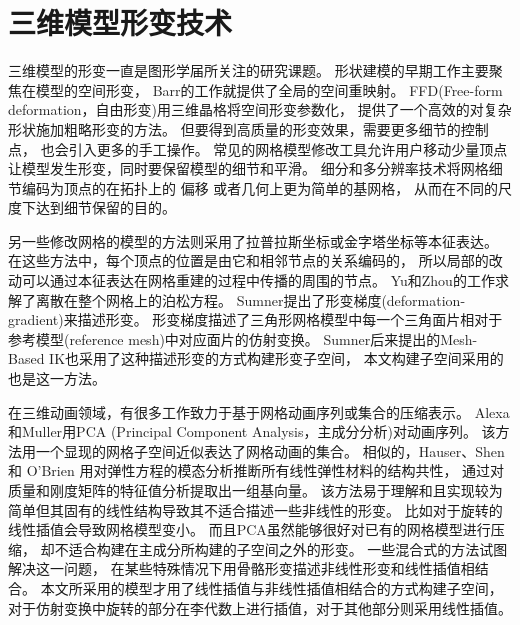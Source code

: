 \section{三维模型形变技术}
三维模型的形变一直是图形学届所关注的研究课题。
形状建模的早期工作主要聚焦在模型的空间形变，
Barr的工作\cite{barr1984global}就提供了全局的空间重映射。
FFD(Free-form deformation，自由形变)\cite{sederberg1986free}用三维晶格将空间形变参数化，
提供了一个高效的对复杂形状施加粗略形变的方法。
但要得到高质量的形变效果，需要更多细节的控制点\cite{coquillart1990extended}，
也会引入更多的手工操作。
常见的网格模型修改工具允许用户移动少量顶点让模型发生形变，同时要保留模型的细节和平滑。
细分和多分辨率技术将网格细节编码为顶点的在拓扑上的
偏移\cite{zorin1997interactive}\cite{kobbelt2000multiresolution}
或者几何上更为简单的基网格\cite{kobbelt1998interactive}，
从而在不同的尺度下达到细节保留的目的。

另一些修改网格的模型的方法则采用了拉普拉斯坐标或金字塔坐标等本征表达。
在这些方法中，每个顶点的位置是由它和相邻节点的关系编码的，
所以局部的改动可以通过本征表达在网格重建的过程中传播的周围的节点。
Yu和Zhou的工作\cite{yu2004mesh}求解了离散在整个网格上的泊松方程。
Sumner提出了形变梯度(deformation-gradient)\cite{sumner2004deformation}来描述形变。
形变梯度描述了三角形网格模型中每一个三角面片相对于参考模型(reference mesh)中对应面片的仿射变换。
Sumner后来提出的Mesh-Based IK\cite{sumner2005mesh}也采用了这种描述形变的方式构建形变子空间，
本文构建子空间采用的也是这一方法。

在三维动画领域，有很多工作致力于基于网格动画序列或集合的压缩表示。
Alexa和Muller\cite{alexa2000representing}用PCA
(Principal Component Analysis，主成分分析)对动画序列。
该方法用一个显现的网格子空间近似表达了网格动画的集合。
相似的，Hauser、Shen和 O’Brien\cite{hauser2003interactive}
用对弹性方程的模态分析推断所有线性弹性材料的结构共性，
通过对质量和刚度矩阵的特征值分析提取出一组基向量。
该方法易于理解和且实现较为简单但其固有的线性结构导致其不适合描述一些非线性的形变。
比如对于旋转的线性插值会导致网格模型变小。
而且PCA虽然能够很好对已有的网格模型进行压缩，
却不适合构建在主成分所构建的子空间之外的形变。
一些混合式的方法试图解决这一问题，
在某些特殊情况下用骨骼形变描述非线性形变和线性插值相结合\cite{lewis2000pose}。
本文所采用的模型才用了线性插值与非线性插值相结合的方式构建子空间，
对于仿射变换中旋转的部分在李代数上进行插值，对于其他部分则采用线性插值。
